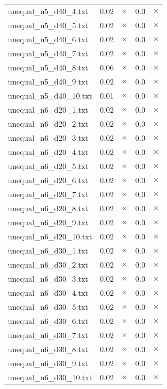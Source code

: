 \documentclass{article}
\begin{document}
\begin{center}
\begin{tabular}{lrrrr}
unequal\_n5\_d40\_4.txt & 0.02 & 
$\times$
 & 0.0 & 
$\times$
\\
unequal\_n5\_d40\_5.txt & 0.02 & 
$\times$
 & 0.0 & 
$\times$
\\
unequal\_n5\_d40\_6.txt & 0.02 & 
$\times$
 & 0.0 & 
$\times$
\\
unequal\_n5\_d40\_7.txt & 0.02 & 
$\times$
 & 0.0 & 
$\times$
\\
unequal\_n5\_d40\_8.txt & 0.06 & 
$\times$
 & 0.0 & 
$\times$
\\
unequal\_n5\_d40\_9.txt & 0.02 & 
$\times$
 & 0.0 & 
$\times$
\\
unequal\_n5\_d40\_10.txt & 0.01 & 
$\times$
 & 0.0 & 
$\times$
\\
unequal\_n6\_d20\_1.txt & 0.02 & 
$\times$
 & 0.0 & 
$\times$
\\
unequal\_n6\_d20\_2.txt & 0.02 & 
$\times$
 & 0.0 & 
$\times$
\\
unequal\_n6\_d20\_3.txt & 0.02 & 
$\times$
 & 0.0 & 
$\times$
\\
unequal\_n6\_d20\_4.txt & 0.02 & 
$\times$
 & 0.0 & 
$\times$
\\
unequal\_n6\_d20\_5.txt & 0.02 & 
$\times$
 & 0.0 & 
$\times$
\\
unequal\_n6\_d20\_6.txt & 0.02 & 
$\times$
 & 0.0 & 
$\times$
\\
unequal\_n6\_d20\_7.txt & 0.02 & 
$\times$
 & 0.0 & 
$\times$
\\
unequal\_n6\_d20\_8.txt & 0.02 & 
$\times$
 & 0.0 & 
$\times$
\\
unequal\_n6\_d20\_9.txt & 0.02 & 
$\times$
 & 0.0 & 
$\times$
\\
unequal\_n6\_d20\_10.txt & 0.02 & 
$\times$
 & 0.0 & 
$\times$
\\
unequal\_n6\_d30\_1.txt & 0.02 & 
$\times$
 & 0.0 & 
$\times$
\\
unequal\_n6\_d30\_2.txt & 0.02 & 
$\times$
 & 0.0 & 
$\times$
\\
unequal\_n6\_d30\_3.txt & 0.02 & 
$\times$
 & 0.0 & 
$\times$
\\
unequal\_n6\_d30\_4.txt & 0.02 & 
$\times$
 & 0.0 & 
$\times$
\\
unequal\_n6\_d30\_5.txt & 0.02 & 
$\times$
 & 0.0 & 
$\times$
\\
unequal\_n6\_d30\_6.txt & 0.02 & 
$\times$
 & 0.0 & 
$\times$
\\
unequal\_n6\_d30\_7.txt & 0.02 & 
$\times$
 & 0.0 & 
$\times$
\\
unequal\_n6\_d30\_8.txt & 0.02 & 
$\times$
 & 0.0 & 
$\times$
\\
unequal\_n6\_d30\_9.txt & 0.02 & 
$\times$
 & 0.0 & 
$\times$
\\
unequal\_n6\_d30\_10.txt & 0.02 & 
$\times$
 & 0.0 & 
$\times$
\\
\hline\end{tabular}
\end{center}
\end{document}
